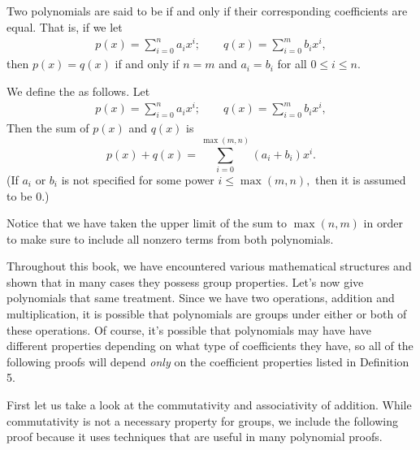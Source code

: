 \begin{defn} Two polynomials are said to be   if and only if their corresponding coefficients are equal. That is, if we let    
\begin{align*}
p(x)  = \sum^{n}_{i=0} a_i x^i; \qquad
q(x)  = \sum^{m}_{i=0} b_i x^i,
\end{align*}
then $p(x) = q(x)$ if and only if $n=m$ and $a_i = b_i$ for all $0 \leq i \leq n$.
\end {defn}

\begin {defn}
We define the  as follows.  Let
\begin{align*}
p(x)  = \sum^{n}_{i=0} a_i x^i ; \qquad
q(x)  = \sum^{m}_{i=0} b_i x^i,
\end{align*}
Then the sum of $p(x)$ and $q(x)$ is
\[
p(x) + q(x) =  \sum_{i=0}^{\max(m,n)} (a_i + b_i) x^i.
\]
(If $a_i$ or $b_i$ is not specified for some power $i \leq \max(m,n),$ then it is assumed to be 0.)
  
\end{defn}
Notice that we have taken the upper limit of the sum to $\max(n,m)$ in order to make sure to include all nonzero terms from both polynomials. 

Throughout this book, we have encountered various mathematical structures and shown that in many cases they possess group properties. Let's now give polynomials that same treatment. Since we have two operations, addition and multiplication, it is possible that polynomials are groups under either or both of these operations. Of course, it's possible that polynomials may have have different properties depending on what type of coefficients they have, so all of the following proofs will depend \emph{only} on the coefficient properties listed in Definition 5.  

First let us take a look at the commutativity and associativity of addition.  While commutativity is not a necessary property for groups, we include the following proof because it uses techniques that are useful in many polynomial proofs.

